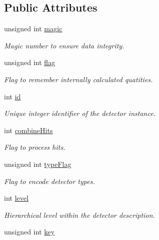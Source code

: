 \subsection*{Public Attributes}
\begin{DoxyCompactItemize}
\item 
unsigned int \hyperlink{class_d_d4hep_1_1_geometry_1_1_det_element_object_a9a65b2f4323f3df2d7bdb7858b216fb6}{magic}
\begin{DoxyCompactList}\small\item\em Magic number to ensure data integrity. \end{DoxyCompactList}\item 
unsigned int \hyperlink{class_d_d4hep_1_1_geometry_1_1_det_element_object_abcab90748d7423310fbf73fcc54cef47}{flag}
\begin{DoxyCompactList}\small\item\em Flag to remember internally calculated quatities. \end{DoxyCompactList}\item 
int \hyperlink{class_d_d4hep_1_1_geometry_1_1_det_element_object_a32d2a3f77fa7afde62ad5d08aa14919f}{id}
\begin{DoxyCompactList}\small\item\em Unique integer identifier of the detector instance. \end{DoxyCompactList}\item 
int \hyperlink{class_d_d4hep_1_1_geometry_1_1_det_element_object_a36e650a06cc4b82337bc3354bd38402a}{combine\+Hits}
\begin{DoxyCompactList}\small\item\em Flag to process hits. \end{DoxyCompactList}\item 
unsigned int \hyperlink{class_d_d4hep_1_1_geometry_1_1_det_element_object_a0038f8f124cb13a1cca03af95964dcf5}{type\+Flag}
\begin{DoxyCompactList}\small\item\em Flag to encode detector types. \end{DoxyCompactList}\item 
int \hyperlink{class_d_d4hep_1_1_geometry_1_1_det_element_object_a734b4a41fa1d35d9a02b3b15d2739537}{level}
\begin{DoxyCompactList}\small\item\em Hierarchical level within the detector description. \end{DoxyCompactList}\item 
unsigned int \hyperlink{class_d_d4hep_1_1_geometry_1_1_det_element_object_a77994e3dcc6416eadd3be577c46a8e29}{key}

\end{DoxyCompactItemize}
